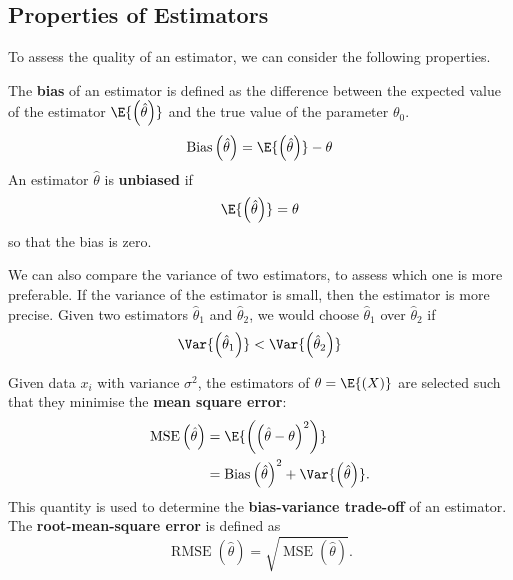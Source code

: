 \documentclass{article}
\begin{document}
\subsection{Properties of Estimators}
To assess the quality of an estimator, we can consider the following
properties.
\begin{definition}[Bias]
    The \textbf{bias} of an estimator is defined as the difference
    between the expected value of the estimator
    \(\E{\left( \hat{\theta} \right)}\) and the true value of the
    parameter \(\theta_0\).
    \begin{equation*}
        \operatorname{Bias}\left( \hat{\theta} \right) = \E{\left( \hat{\theta} \right)} - \theta
    \end{equation*}
    An estimator \(\hat{\theta}\) is \textbf{unbiased} if
    \begin{equation*}
        \E{\left( \hat{\theta} \right)} = \theta
    \end{equation*}
    so that the bias is zero.
\end{definition}
We can also compare the variance of two estimators, to assess which one
is more preferable. If the variance of the estimator is small, then the
estimator is more precise. Given two estimators \(\hat{\theta}_1\) and
\(\hat{\theta}_2\), we would choose \(\hat{\theta}_1\) over
\(\hat{\theta}_2\) if
\begin{equation*}
    \Var{\left( \hat{\theta}_1 \right)} < \Var{\left( \hat{\theta}_2 \right)}
\end{equation*}
\begin{definition}
    Given data \(x_i\) with variance \(\sigma^2\), the estimators of
    \(\theta = \E{\left( X \right)}\) are selected such that they
    minimise the \textbf{mean square error}:
    \begin{align*}
        \operatorname{MSE}\left( \hat{\theta} \right) & = \E{\left( \left( \hat{\theta} - \theta \right)^2 \right)}                             \\
                                                      & = \operatorname{Bias}\left( \hat{\theta} \right)^2 + \Var{\left( \hat{\theta} \right)}.
    \end{align*}
    This quantity is used to determine the \textbf{bias-variance
        trade-off} of an estimator. The \textbf{root-mean-square error} is
    defined as
    \begin{equation*}
        \operatorname{RMSE}\left( \hat{\theta} \right) = \sqrt{\operatorname{MSE}\left( \hat{\theta} \right)}.
    \end{equation*}
\end{definition}
\end{document}
